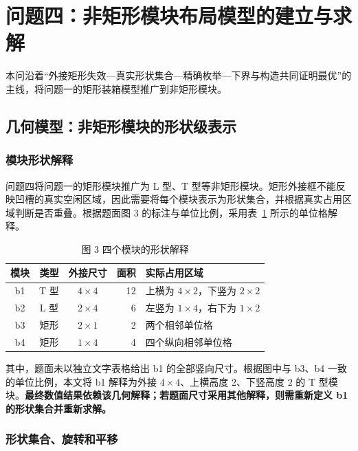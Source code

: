 \section{问题四：非矩形模块布局模型的建立与求解}

本问沿着“外接矩形失效---真实形状集合---精确枚举---下界与构造共同证明最优”的主线，将问题一的矩形装箱模型推广到非矩形模块。

\subsection{几何模型：非矩形模块的形状级表示}

\subsubsection{模块形状解释}

问题四将问题一的矩形模块推广为 L 型、T 型等非矩形模块。矩形外接框不能反映凹槽的真实空闲区域，因此需要将每个模块表示为形状集合，并根据真实占用区域判断是否重叠。根据题面图 3 的标注与单位比例，采用表~\ref{tab:q4_shape_data} 所示的单位格解释。

\begin{table}[H]
  \centering
  \caption{图 3 四个模块的形状解释}
  \label{tab:q4_shape_data}
  \small
  \renewcommand{\arraystretch}{1.15}
  \begin{tabular}{c c c r p{6.0cm}}
    \toprule
    模块 & 类型 & 外接尺寸 & 面积 & 实际占用区域 \\
    \midrule
    b1 & T 型 & $4\times4$ & 12 & 上横为 $4\times2$，下竖为 $2\times2$ \\
    b2 & L 型 & $2\times4$ & 6 & 左竖为 $1\times4$，右下为 $1\times2$ \\
    b3 & 矩形 & $2\times1$ & 2 & 两个相邻单位格 \\
    b4 & 矩形 & $1\times4$ & 4 & 四个纵向相邻单位格 \\
    \bottomrule
  \end{tabular}
\end{table}

其中，题面未以独立文字表格给出 b1 的全部竖向尺寸。根据图中与 b3、b4 一致的单位比例，本文将 b1 解释为外接 $4\times4$、上横高度 $2$、下竖高度 $2$ 的 T 型模块。\textbf{最终数值结果依赖该几何解释；若题面尺寸采用其他解释，则需重新定义 b1 的形状集合并重新求解。}

\subsubsection{形状集合、旋转和平移}

